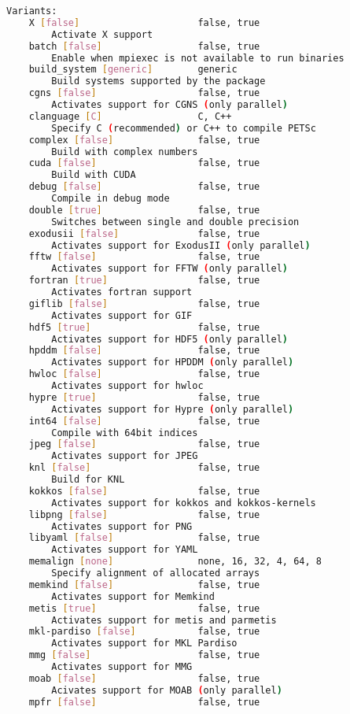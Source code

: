 {\begin{lstlisting}[language=bash]
Variants:
    X [false]                     false, true
        Activate X support
    batch [false]                 false, true
        Enable when mpiexec is not available to run binaries
    build_system [generic]        generic
        Build systems supported by the package
    cgns [false]                  false, true
        Activates support for CGNS (only parallel)
    clanguage [C]                 C, C++
        Specify C (recommended) or C++ to compile PETSc
    complex [false]               false, true
        Build with complex numbers
    cuda [false]                  false, true
        Build with CUDA
    debug [false]                 false, true
        Compile in debug mode
    double [true]                 false, true
        Switches between single and double precision
    exodusii [false]              false, true
        Activates support for ExodusII (only parallel)
    fftw [false]                  false, true
        Activates support for FFTW (only parallel)
    fortran [true]                false, true
        Activates fortran support
    giflib [false]                false, true
        Activates support for GIF
    hdf5 [true]                   false, true
        Activates support for HDF5 (only parallel)
    hpddm [false]                 false, true
        Activates support for HPDDM (only parallel)
    hwloc [false]                 false, true
        Activates support for hwloc
    hypre [true]                  false, true
        Activates support for Hypre (only parallel)
    int64 [false]                 false, true
        Compile with 64bit indices
    jpeg [false]                  false, true
        Activates support for JPEG
    knl [false]                   false, true
        Build for KNL
    kokkos [false]                false, true
        Activates support for kokkos and kokkos-kernels
    libpng [false]                false, true
        Activates support for PNG
    libyaml [false]               false, true
        Activates support for YAML
    memalign [none]               none, 16, 32, 4, 64, 8
        Specify alignment of allocated arrays
    memkind [false]               false, true
        Activates support for Memkind
    metis [true]                  false, true
        Activates support for metis and parmetis
    mkl-pardiso [false]           false, true
        Activates support for MKL Pardiso
    mmg [false]                   false, true
        Activates support for MMG
    moab [false]                  false, true
        Acivates support for MOAB (only parallel)
    mpfr [false]                  false, true

\end{lstlisting}}
